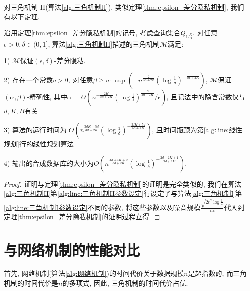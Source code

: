 对三角机制 II(算法\ref{alg:三角机制II}), 类似定理\ref{thm:epsilon_差分隐私机制}, 我们有以下定理.
\begin{thm}\label{thm:epsilon_delta_差分隐私机制}
  沿用定理\ref{thm:epsilon_差分隐私机制}的记号, 考虑查询集合$Q_{C_B^K}$. 对任意$\epsilon > 0, \delta\in(0, 1]$, 算法\ref{alg:三角机制II}描述的三角机制$\mathcal{M}$满足:
  
  1) $\mathcal{M}$保证$(\epsilon, \delta)$-差分隐私.
  
  2) 存在一个常数$c > 0$, 对任意$\beta \ge c \cdot \exp\left(-n^{\frac{2}{3d+2k}}\left(\log\frac{1}{\delta}\right)^{-\frac{1}{3d+2K}}\right)$, $\mathcal{M}$保证$(\alpha, \beta)$-精确性, 其中$\alpha=O \left(n^{-\frac{2K}{3d+2K}}\left(\log\frac{1}{\delta}\right)^{\frac{K}{3d+2K}}/\epsilon \right)$, 且记法中的隐含常数仅与$d, K, B$有关.
  
  3) 算法的运行时间为 $O \left(n^{\frac{3dK+5d}{3d+2K}}\left(\log\frac{1}{\delta}\right)^{-\frac{3dK+5d}{6d+4K}}\right)$, 且时间瓶颈为第\ref{alg:line:线性规划}行的线性规划算法.
  
  4) 输出的合成数据库的大小为$O \left(n^{\frac{4d+4K+2}{3d+2K}}
\left(\log\frac{1}{\delta}\right) ^{-\frac{2d+2K+1}{3d+2K}} \right)$.
\end{thm}
\begin{proof}
  证明与定理\ref{thm:epsilon_差分隐私机制}的证明是完全类似的, 我们在算法\ref{alg:三角机制II}第\ref{alg:line:三角机制II参数设定}行设定了与算法\ref{alg:三角机制I}第\ref{alg:line:三角机制I参数设定}不同的参数, 将这些参数以及噪音规模$\frac{\sqrt{2t^d\log\frac{1}{\delta}}}{n \epsilon}$代入到定理\ref{thm:epsilon_差分隐私机制}的证明过程立得. 
\end{proof}
\section{与网络机制的性能对比} %
\label{sec:与网络机制的性能对比}
首先, 网络机制(算法\ref{alg:网络机制})的时间代价关于数据规模$n$是超指数的, 而三角机制的时间代价是$n$的多项式, 因此, 三角机制的时间代价占优.

